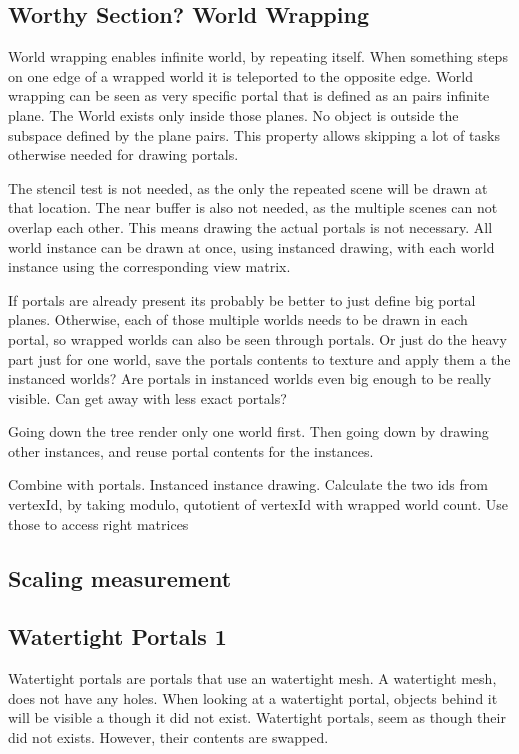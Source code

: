 \subsection{Worthy Section? World Wrapping}

World wrapping enables infinite world, by repeating itself. When something steps on one edge of a wrapped world it is teleported to the opposite edge. World wrapping can be seen as very specific portal that is defined as an pairs infinite plane. The World exists only inside those planes. No object is outside the subspace defined by the plane pairs. This property allows skipping a lot of tasks otherwise needed for drawing portals.

The stencil test is not needed, as the only the repeated scene will be drawn at that location. The near buffer is also not needed, as the multiple scenes can not overlap each other. This means drawing the actual portals is not necessary. All world instance can be drawn at once, using instanced drawing, with each world instance using the corresponding view matrix.

If portals are already present its probably be better to just define big portal planes. Otherwise, each of those multiple worlds needs to be drawn in each portal, so wrapped worlds can also be seen through portals. Or just do the heavy part just for one world, save the portals contents to texture and apply them a the instanced worlds? Are portals in instanced worlds even big enough to be really visible. Can get away with less exact portals?

Going down the tree render only one world first. Then going down by drawing other instances, and reuse portal contents for the instances.

Combine with portals. Instanced instance drawing. Calculate the two ids from vertexId, by taking modulo, qutotient of vertexId with wrapped world count. Use those to access right matrices

	

\subsection{Scaling measurement}

\subsection{Watertight Portals 1}
Watertight portals are portals that use an watertight mesh. A watertight mesh, does not have any holes. When looking at a watertight portal, objects behind it will be visible a though it did not exist. Watertight portals, seem as though their did not exists. However, their contents are swapped.

